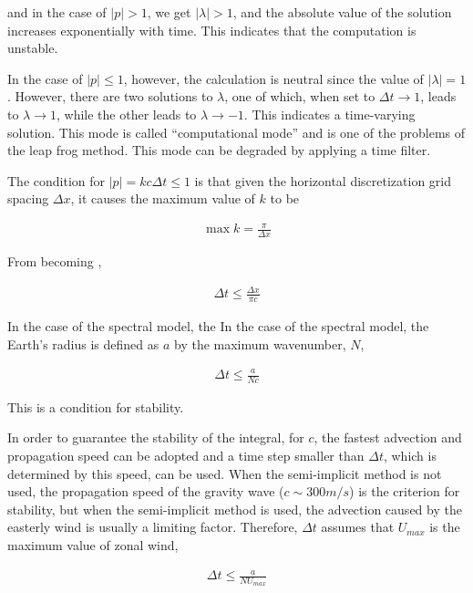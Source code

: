 and in the case of \(|p|>1\), we get \(|\lambda| > 1\), and the absolute
value of the solution increases exponentially with time. This indicates
that the computation is unstable.

In the case of \(|p| \le 1\), however, the calculation is neutral since
the value of \(|\lambda| = 1\). However, there are two solutions to
\(\lambda\), one of which, when set to \(\Delta t \rightarrow 1\), leads
to \(\lambda \rightarrow 1\), while the other leads to
\(\lambda \rightarrow -1\). This indicates a time-varying solution. This
mode is called ``computational mode'' and is one of the problems of the
leap frog method. This mode can be degraded by applying a time filter.

The condition for \(|p|=kc \Delta t \le 1\) is that given the horizontal
discretization grid spacing \(\Delta x\), it causes the maximum value of
\(k\) to be

\begin{eqnarray}
  \max k = \frac{\pi}{\Delta x}
\end{eqnarray}

From becoming ,

\begin{eqnarray}
   \Delta t \le \frac{\Delta x}{\pi c}
\end{eqnarray}

In the case of the spectral model, the In the case of the spectral
model, the Earth's radius is defined as \(a\) by the maximum wavenumber,
\(N\),

\begin{eqnarray}
   \Delta t \le \frac{a}{N c}  
\end{eqnarray}

This is a condition for stability.

In order to guarantee the stability of the integral, for \(c\), the
fastest advection and propagation speed can be adopted and a time step
smaller than \(\Delta t\), which is determined by this speed, can be
used. When the semi-implicit method is not used, the propagation speed
of the gravity wave (\(c \sim 300m/s\)) is the criterion for stability,
but when the semi-implicit method is used, the advection caused by the
easterly wind is usually a limiting factor. Therefore, \(\Delta t\)
assumes that \(U_{max}\) is the maximum value of zonal wind,

\begin{eqnarray}
   \Delta t \le \frac{a}{N U_{max}}  
\end{eqnarray}

